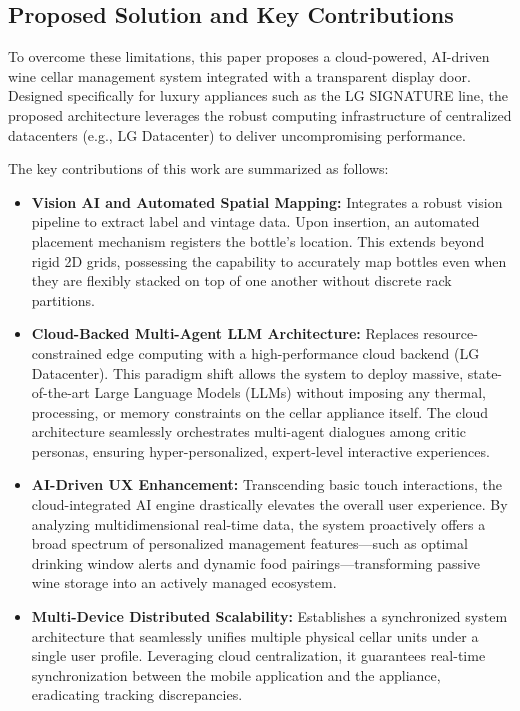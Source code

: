 \documentclass[conference]{IEEEtran}
\begin{document}
\subsection{Proposed Solution and Key Contributions}
To overcome these limitations, this paper proposes a cloud-powered, AI-driven wine cellar management system integrated with a transparent display door. Designed specifically for luxury appliances such as the LG SIGNATURE line, the proposed architecture leverages the robust computing infrastructure of centralized datacenters (e.g., LG Datacenter) to deliver uncompromising performance.

The key contributions of this work are summarized as follows:
\begin{itemize}
    \item \textbf{Vision AI and Automated Spatial Mapping:} Integrates a robust vision pipeline to extract label and vintage data. Upon insertion, an automated placement mechanism registers the bottle's location. This extends beyond rigid 2D grids, possessing the capability to accurately map bottles even when they are flexibly stacked on top of one another without discrete rack partitions.
    \item \textbf{Cloud-Backed Multi-Agent LLM Architecture:} Replaces resource-constrained edge computing with a high-performance cloud backend (LG Datacenter). This paradigm shift allows the system to deploy massive, state-of-the-art Large Language Models (LLMs) without imposing any thermal, processing, or memory constraints on the cellar appliance itself. The cloud architecture seamlessly orchestrates multi-agent dialogues among critic personas, ensuring hyper-personalized, expert-level interactive experiences.
    \item \textbf{AI-Driven UX Enhancement:} Transcending basic touch interactions, the cloud-integrated AI engine drastically elevates the overall user experience. By analyzing multidimensional real-time data, the system proactively offers a broad spectrum of personalized management features---such as optimal drinking window alerts and dynamic food pairings---transforming passive wine storage into an actively managed ecosystem.
    \item \textbf{Multi-Device Distributed Scalability:} Establishes a synchronized system architecture that seamlessly unifies multiple physical cellar units under a single user profile. Leveraging cloud centralization, it guarantees real-time synchronization between the mobile application and the appliance, eradicating tracking discrepancies.
\end{itemize}
\end{document}
